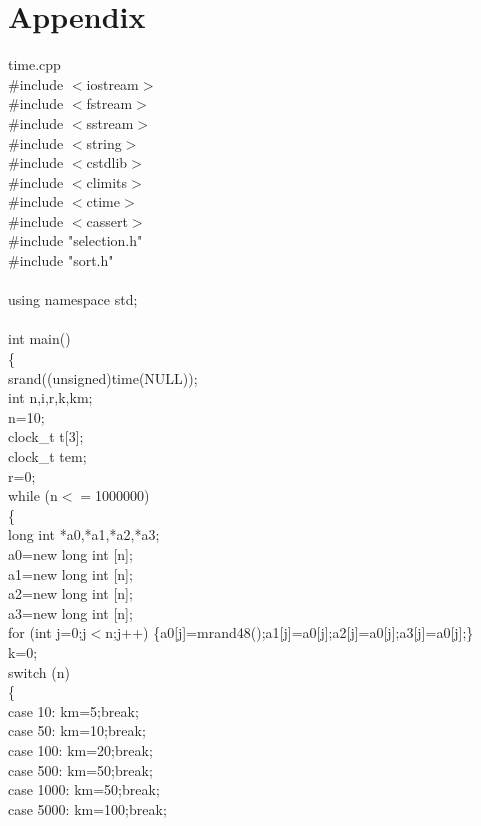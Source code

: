 \documentclass{article}
\begin{document}
\section{Appendix}
time.cpp\\
\#include $<$iostream$>$\\
\#include $<$fstream$>$\\
\#include $<$sstream$>$\\
\#include $<$string$>$\\
\#include $<$cstdlib$>$\\
\#include $<$climits$>$\\
\#include $<$ctime$>$\\
\#include $<$cassert$>$\\
\#include "selection.h"\\
\#include "sort.h"\\
\\
using namespace std;\\
\\
int main()\\
\{\\
    srand((unsigned)time(NULL));\\
    int n,i,r,k,km;\\
    n=10;\\
    clock\_t t[3];\\
    clock\_t tem;\\
    r=0;\\
    while (n$<=$1000000)\\
    \{\\
	long int *a0,*a1,*a2,*a3;\\
	a0=new long int [n];\\
	a1=new long int [n];\\
	a2=new long int [n];\\
    a3=new long int [n];\\
	for (int j=0;j$<$n;j++) \{a0[j]=mrand48();a1[j]=a0[j];a2[j]=a0[j];a3[j]=a0[j];\}\\
	k=0;\\
	switch (n)\\
	\{\\
	    case 10: km=5;break;\\
	    case 50: km=10;break;\\
	    case 100: km=20;break;\\
	    case 500: km=50;break;\\
	    case 1000: km=50;break;\\
	    case 5000: km=100;break;\\
\end{document}
